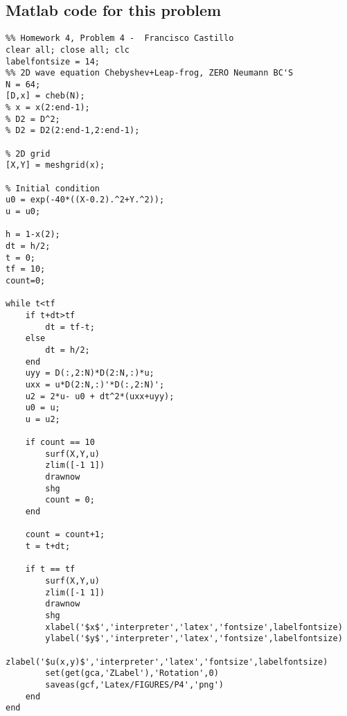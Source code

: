 \subsection*{Matlab code for this problem}
\begin{verbatim}
%% Homework 4, Problem 4 -  Francisco Castillo
clear all; close all; clc
labelfontsize = 14;
%% 2D wave equation Chebyshev+Leap-frog, ZERO Neumann BC'S
N = 64;
[D,x] = cheb(N);
% x = x(2:end-1);
% D2 = D^2;
% D2 = D2(2:end-1,2:end-1);
 
% 2D grid
[X,Y] = meshgrid(x);
 
% Initial condition
u0 = exp(-40*((X-0.2).^2+Y.^2));
u = u0;
 
h = 1-x(2);
dt = h/2;
t = 0;
tf = 10;
count=0;

while t<tf
    if t+dt>tf
        dt = tf-t;
    else
        dt = h/2;
    end
    uyy = D(:,2:N)*D(2:N,:)*u;
    uxx = u*D(2:N,:)'*D(:,2:N)';
    u2 = 2*u- u0 + dt^2*(uxx+uyy);
    u0 = u;
    u = u2;
    
    if count == 10 
        surf(X,Y,u)
        zlim([-1 1])
        drawnow
        shg
        count = 0;
    end
        
    count = count+1;
    t = t+dt;
    
    if t == tf
        surf(X,Y,u)
        zlim([-1 1])
        drawnow
        shg
        xlabel('$x$','interpreter','latex','fontsize',labelfontsize)
        ylabel('$y$','interpreter','latex','fontsize',labelfontsize)
        zlabel('$u(x,y)$','interpreter','latex','fontsize',labelfontsize)
        set(get(gca,'ZLabel'),'Rotation',0)
        saveas(gcf,'Latex/FIGURES/P4','png')
    end
end
\end{verbatim}